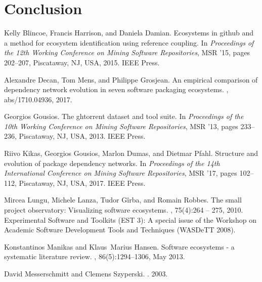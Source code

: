 \documentclass[10pt,conference]{IEEEtran}
\begin{document}
\section{Conclusion}


\begin{thebibliography}{00}

  Kelly Blincoe, Francis Harrison, and Daniela Damian.
  \newblock Ecosystems in github and a method for ecosystem identification using
    reference coupling.
  \newblock In {\em Proceedings of the 12th Working Conference on Mining Software
    Repositories}, MSR '15, pages 202--207, Piscataway, NJ, USA, 2015. IEEE
    Press.
  
  Alexandre Decan, Tom Mens, and Philippe Grosjean.
  \newblock An empirical comparison of dependency network evolution in seven
    software packaging ecosystems.
  , abs/1710.04936, 2017.
  
  Georgios Gousios.
  \newblock The ghtorrent dataset and tool suite.
  \newblock In {\em Proceedings of the 10th Working Conference on Mining Software
    Repositories}, MSR '13, pages 233--236, Piscataway, NJ, USA, 2013. IEEE
    Press.
  
  Riivo Kikas, Georgios Gousios, Marlon Dumas, and Dietmar Pfahl.
  \newblock Structure and evolution of package dependency networks.
  \newblock In {\em Proceedings of the 14th International Conference on Mining
    Software Repositories}, MSR '17, pages 102--112, Piscataway, NJ, USA, 2017.
    IEEE Press.
  
  Mircea Lungu, Michele Lanza, Tudor Gîrba, and Romain Robbes.
  \newblock The small project observatory: Visualizing software ecosystems.
  , 75(4):264 -- 275, 2010.
  \newblock Experimental Software and Toolkits (EST 3): A special issue of the
    Workshop on Academic Software Development Tools and Techniques (WASDeTT
    2008).
  
  Konstantinos Manikas and Klaus~Marius Hansen.
  \newblock Software ecosystems - a systematic literature review.
  , 86(5):1294--1306, May 2013.
  
  David Messerschmitt and Clemens Szyperski.
  .
   2003.
  

\end{thebibliography}
\end{document}
